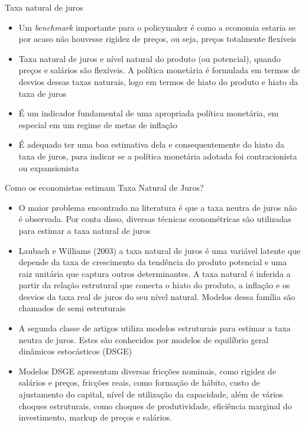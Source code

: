 \documentclass[9pt]{beamer}
\let\olditem\item
\renewcommand{\item}{%
\olditem\vspace{\fill}}
\begin{document}
\begin{frame}{Taxa natural de juros}
\begin{itemize}

\item Um \textit{benchmark} importante para o policymaker é como a economia estaria se por acaso não houvesse rigidez de preços, ou seja, preços totalmente flexíveis

\item Taxa natural de juros e nível natural do produto (ou potencial), quando preços e salários são flexíveis. A política monetária é formulada em termos de desvios dessas taxas naturais, logo em termos de hiato do produto e hiato da taxa de juros

\item É um indicador fundamental de uma apropriada política monetária, em especial em um regime de metas de inflação

\item É adequado ter uma boa estimativa dela e consequentemente do hiato da taxa de juros, para indicar se a política monetária adotada foi contracionista ou expansionista

\end{itemize}
\end{frame}
\begin{frame}{Como os economistas estimam Taxa Natural de Juros?}
\begin{itemize}

\item O maior problema encontrado na literatura é que a taxa neutra de juros não é observada. Por conta disso, diversas técnicas econométricas são utilizadas para estimar a taxa natural de juros 

\item Laubach e Williams (2003) a taxa natural de juros é uma variável latente que depende da taxa de crescimento da tendência do produto potencial e uma raiz unitária que captura outros determinantes. A taxa natural é inferida a partir da relação estrutural que conecta o hiato do produto, a inflação e os desvios da taxa real de juros do seu nível natural. Modelos dessa família são chamados de semi estruturais

\item A segunda classe de artigos utiliza modelos estruturais para estimar a taxa neutra de juros. Estes são conhecidos por modelos de equilíbrio geral dinâmicos estocásticos (DSGE)

\item Modelos DSGE apresentam diversas fricções nominais, como rigidez de salários e preços, fricções reais, como formação de hábito, custo de ajustamento do capital, nível de utilização da capacidade, além de vários choques estruturais, como choques de produtividade, eficiência marginal do investimento, markup de preços e salários.

\end{itemize}
\end{frame}
\end{document}

